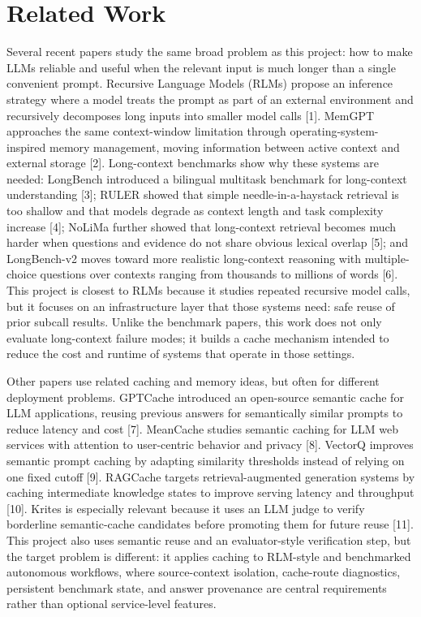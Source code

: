 \documentclass[10pt,a4paper]{article}
\begin{document}
\section{Related Work}

Several recent papers study the same broad problem as this project: how to make LLMs reliable and useful when the relevant input is much longer than a single convenient prompt. Recursive Language Models (RLMs) propose an inference strategy where a model treats the prompt as part of an external environment and recursively decomposes long inputs into smaller model calls [1]. MemGPT approaches the same context-window limitation through operating-system-inspired memory management, moving information between active context and external storage [2]. Long-context benchmarks show why these systems are needed: LongBench introduced a bilingual multitask benchmark for long-context understanding [3]; RULER showed that simple needle-in-a-haystack retrieval is too shallow and that models degrade as context length and task complexity increase [4]; NoLiMa further showed that long-context retrieval becomes much harder when questions and evidence do not share obvious lexical overlap [5]; and LongBench-v2 moves toward more realistic long-context reasoning with multiple-choice questions over contexts ranging from thousands to millions of words [6]. This project is closest to RLMs because it studies repeated recursive model calls, but it focuses on an infrastructure layer that those systems need: safe reuse of prior subcall results. Unlike the benchmark papers, this work does not only evaluate long-context failure modes; it builds a cache mechanism intended to reduce the cost and runtime of systems that operate in those settings.

Other papers use related caching and memory ideas, but often for different deployment problems. GPTCache introduced an open-source semantic cache for LLM applications, reusing previous answers for semantically similar prompts to reduce latency and cost [7]. MeanCache studies semantic caching for LLM web services with attention to user-centric behavior and privacy [8]. VectorQ improves semantic prompt caching by adapting similarity thresholds instead of relying on one fixed cutoff [9]. RAGCache targets retrieval-augmented generation systems by caching intermediate knowledge states to improve serving latency and throughput [10]. Krites is especially relevant because it uses an LLM judge to verify borderline semantic-cache candidates before promoting them for future reuse [11]. This project also uses semantic reuse and an evaluator-style verification step, but the target problem is different: it applies caching to RLM-style and benchmarked autonomous workflows, where source-context isolation, cache-route diagnostics, persistent benchmark state, and answer provenance are central requirements rather than optional service-level features.
\end{document}
